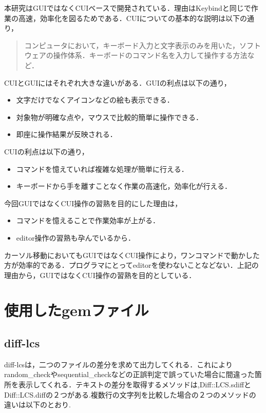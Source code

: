 本研究はGUIではなくCUIベースで開発されている．理由はKeybindと同じで作業の高速，効率化を図るためである．CUIについての基本的な説明は以下の通り，
\begin{quotation}
コンピュータにおいて，キーボード入力と文字表示のみを用いた，ソフトウェアの操作体系．キーボードのコマンド名を入力して操作する方法など． \cite{cui}
\end{quotation}CUIとGUIにはそれぞれ大きな違いがある．GUIの利点は以下の通り，

\begin{itemize}
\tightlist
\item
  文字だけでなくアイコンなどの絵も表示できる．
\item
  対象物が明確な点や，マウスで比較的簡単に操作できる．
\item
  即座に操作結果が反映される．
\end{itemize}
CUIの利点は以下の通り，

\begin{itemize}
\tightlist
\item
  コマンドを憶えていれば複雑な処理が簡単に行える．
\item
  キーボードから手を離すことなく作業の高速化，効率化が行える．
\end{itemize}
今回GUIではなくCUI操作の習熟を目的にした理由は，

\begin{itemize}
\tightlist
\item
  コマンドを憶えることで作業効率が上がる．
\item
  editor操作の習熟も孕んでいるから．
\end{itemize}
カーソル移動においてもGUIではなくCUI操作により，ワンコマンドで動かした方が効率的である．プログラマにとってeditorを使わないことなどない．上記の理由から，GUIではなくCUI操作の習熟を目的としている．

    \section{使用したgemファイル}\label{ux4f7fux7528ux3057ux305fgemux30d5ux30a1ux30a4ux30eb}

    \subsection{diff-lcs}\label{diff-lcs}

diff-lcsは，二つのファイルの差分を求めて出力してくれる．これによりrandom\_checkやsequential\_checkなどの正誤判定で誤っていた場合に間違った箇所を表示してくれる．テキストの差分を取得するメソッドは,Diff::LCS.sdiffと Diff::LCS.diffの２つがある.複数行の文字列を比較した場合の２つのメソッドの違いは以下のとおり.

